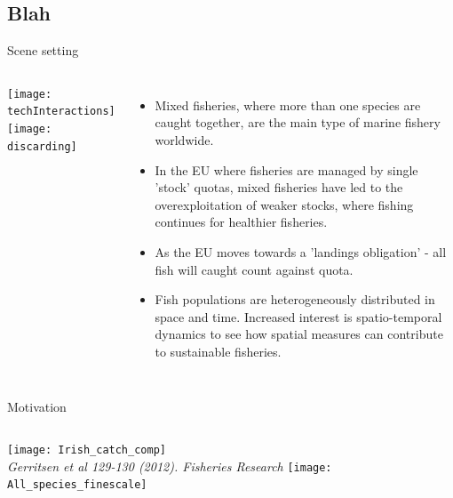 \documentclass[xcolor=x11names,compress]{beamer}
\renewcommand{\(}{\begin{columns}}
\renewcommand{\)}{\end{columns}}
\newcommand{\<}[1]{\begin{column}{#1}}
\renewcommand{\>}{\end{column}}
\begin{document}
\subsection{Blah}
\begin{frame}{Scene setting}

\begin{columns}
	
	
\column{0.3\paperwidth}
\vspace{-2cm}
\texttt{[image: techInteractions]}\\ 
\texttt{[image: discarding]} 

\column{0.7\paperwidth}

\begin{itemize}
	\small	
	\setlength\itemsep{1em}
	\pause
	\item Mixed fisheries, where more than one species are caught together,
		are the main type of marine fishery worldwide. \pause
	\item In the EU where fisheries are managed by single 'stock' quotas,
		mixed fisheries have led to the overexploitation of weaker
		stocks, where fishing continues for healthier fisheries. \pause
	\item As the EU moves towards a 'landings obligation' - all fish will
		caught count against quota. \pause
	\item Fish populations are heterogeneously distributed in space and
		time. Increased interest is spatio-temporal dynamics to see how
		spatial measures can contribute to sustainable fisheries. 
\end{itemize}
	
\end{columns}

\end{frame}

\begin{frame}{Motivation}

\begin{columns}
\column{0.4\paperwidth}
\texttt{[image: Irish\_catch\_comp]}
\\
\tiny
\hspace{0.2cm}
\textit{Gerritsen et al 129-130 (2012). Fisheries Research} 
\column{0.6\paperwidth}
\texttt{[image: All\_species\_finescale]}

\end{columns}
\end{frame}
\end{document}
